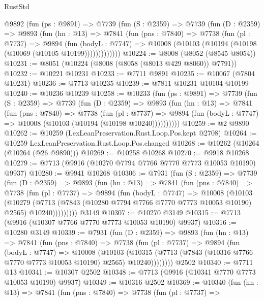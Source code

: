 \begin{lexlean}{RustStd}
\begin{coremodule}
    @9892
      (fun (ps : @9891) =>
      @7739
        (fun (S : @2359) =>
        @7739
          (fun (D : @2359) =>
          @9893
            (fun (hn : @13) =>
            @7841
              (fun (pns : @7840) =>
              @7738
                (fun (pl : @7737) =>
                @9894
                  (fun (bodyL : @7747) =>
                  @10008 (@10103 (@10194 (@10198 (@10069 (@10105 @10199)))))))))))))
@10224 := @8008 (@8052 (@8545 @8054))
@10231 := @8051 (@10224 (@8008 (@8058 (@8013 @429 @8060)) @7791))
@10232 := @10221 @10231
@10233 := @7711 @9891
@10235 := @10067 (@7804 @10231)
@10236 := @7713 @10235
@10239 := @7811 @10231 @10104 @10199
@10240 := @10236 @10239
@10258 := @10233
    (fun (ps : @9891) =>
    @7739
      (fun (S : @2359) =>
      @7739
        (fun (D : @2359) =>
        @9893
          (fun (hn : @13) =>
          @7841
            (fun (pns : @7840) =>
            @7738
              (fun (pl : @7737) =>
              @9894 (fun (bodyL : @7747) => @10008 (@10103 (@10194 (@10198 @10240))))))))))
@10259 := @2 @9890
@10262 := @10259 (LexLeanPreservation.Rust.Loop.Pos.kept @2708)
@10264 := @10259 LexLeanPreservation.Rust.Loop.Pos.changed
@10268 := @10262 (@10264 (@10264 (@26 @9890)))
@10269 := @10258 @10268
@10270 := @9918 @10268
@10279 := @7713 (@9916 (@10270 @7794 @7766 @7770 @7773 @10053 @10190) @9937)
@10280 := @9941 @10268
@10306 := @7931
    (fun (S : @2359) =>
    @7739
      (fun (D : @2359) =>
      @9893
        (fun (hn : @13) =>
        @7841
          (fun (pns : @7840) =>
          @7738
            (fun (pl : @7737) =>
            @9894
              (fun (bodyL : @7747) =>
              @10008
                (@10103
                  (@10279
                    (@7713
                      (@7843 (@10280 @7794 @7766 @7770 @7773 @10053 @10190) @2565)
                      @10240)))))))))
    @3149
@10307 := @10270 @3149
@10315 := @7713 (@9916 (@10307 @7766 @7770 @7773 @10053 @10190) @9937)
@10316 := @10280 @3149
@10339 := @7931
    (fun (D : @2359) =>
    @9893
      (fun (hn : @13) =>
      @7841
        (fun (pns : @7840) =>
        @7738
          (fun (pl : @7737) =>
          @9894
            (fun (bodyL : @7747) =>
            @10008
              (@10103
                (@10315 (@7713 (@7843 (@10316 @7766 @7770 @7773 @10053 @10190) @2565) @10240))))))))
    @2502
@10340 := @7711 @13
@10341 := @10307 @2502
@10348 := @7713 (@9916 (@10341 @7770 @7773 @10053 @10190) @9937)
@10349 := @10316 @2502
@10369 := @10340
    (fun (hn : @13) =>
    @7841
      (fun (pns : @7840) =>
      @7738
        (fun (pl : @7737) =>

\end{coremodule}
\end{lexlean}
